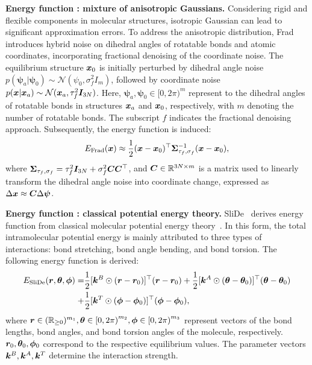 \textbf{Energy function : mixture of anisotropic Gaussians.}
Considering rigid and flexible components in molecular structures, isotropic Gaussian can lead to significant approximation errors.
To address the anisotropic distribution, Frad~\citep{Frad} introduces hybrid noise on dihedral angles of rotatable bonds and atomic coordinates, incorporating fractional denoising of the coordinate noise. The equilibrium structure ${\bm{x}}_0$ is initially perturbed by dihedral angle noise $p(\boldsymbol{\psi}_a|\boldsymbol{\psi}_0) \sim \mathcal{N}(\psi_0, \sigma_f^2 I_m)$, followed by coordinate noise $p({\bm{x}}|{\bm{x}}_a) \sim \mathcal{N}({\bm{x}}_a, \tau_f^2 {\bm{I}}_{3N})$. Here, $\boldsymbol{\psi}_a, \boldsymbol{\psi}_0 \in [0,2\pi)^m$ represent to the dihedral angles of rotatable bonds in structures ${\bm{x}}_a$ and ${\bm{x}}_0$, respectively, with $m$ denoting the number of rotatable bonds. The subscript $f$ indicates the fractional denoising approach. Subsequently, the energy function is induced:
\begin{equation}
    E_{\text{Frad}}({\bm{x}}) \approx \frac{1}{2} ({\bm{x}} - {\bm{x}}_0)^\top \mathbf{\Sigma}_{\tau_f, \sigma_f}^{-1} ({\bm{x}} - {\bm{x}}_0),
\end{equation}
where $\mathbf{\Sigma}_{\tau_f, \sigma_f} = \tau_f^2 {\bm{I}}_{3N} + \sigma_f^2 {\bm{C}}{\bm{C}}^{\top}$, and ${\bm{C}} \in \mathbb{R}^{3N \times m}$ is a matrix used to linearly transform the dihedral angle noise into coordinate change, expressed as $\Delta {\bm{x}} \approx {\bm{C}} \Delta \boldsymbol{\psi}$.


\textbf{Energy function : classical potential energy theory.}
SliDe~\citep{SliDe} derives energy function from classical molecular potential energy theory~\citep{potential1,potential2}. In this form, the total intramolecular potential energy is mainly attributed to three types of interactions: bond stretching, bond angle bending, and bond torsion. The following energy function is derived:
\begin{equation}
\begin{aligned}
E_{\text{SliDe}}({\bm{r}}, {\bm{\theta}}, \boldsymbol{\phi}) =& \frac{1}{2} [{\bm{k}}^B \odot ({\bm{r}} - {\bm{r}}_0)]^\top ({\bm{r}} - {\bm{r}}_0) + \frac{1}{2} [{\bm{k}}^A \odot ({\bm{\theta}} - {\bm{\theta}}_0)]^\top ({\bm{\theta}} - {\bm{\theta}}_0) \\
+& \frac{1}{2} [{\bm{k}}^T \odot (\boldsymbol{\phi} - \boldsymbol{\phi}_0)]^\top (\boldsymbol{\phi} - \boldsymbol{\phi}_0),
\end{aligned}
\end{equation}
where ${\bm{r}} \in (\mathbb{R}_{\geq 0})^{m_1}, {\bm{\theta}} \in {[0,2\pi)}^{m_2}, \boldsymbol{\phi} \in {[0,2\pi)}^{m_3}$ represent vectors of the bond lengths, bond angles, and bond torsion angles of the molecule, respectively. ${\bm{r}}_0, {\bm{\theta}}_0, \boldsymbol{\phi}_0$ correspond to the respective equilibrium values. The parameter vectors ${\bm{k}}^B, {\bm{k}}^A, {\bm{k}}^T$ determine the interaction strength.